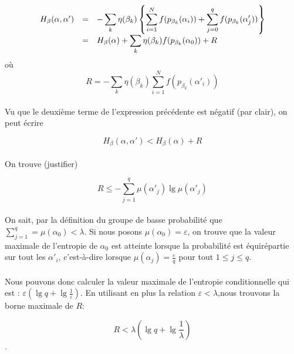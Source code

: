 	\paragraph{}
	\[
		\begin{array}{r c >{\displaystyle}l}
			H_\beta(\alpha,\alpha') &=& 
				- \sum_k\eta(\beta_k)\left\{
					\sum_{i=1}^Nf(p_{\beta_k}(\alpha_i))+
					\sum_{j=0}^qf(p_{\beta_k}(\alpha'_j))
				\right\}\\
			&=& H_\beta(\alpha) + 
				\sum_k\eta(\beta_k)f(p_{\beta_k}(\alpha_0))+R
		\end{array}
	\]
	où
	\[R=- \sum_k\eta(\beta_k)\sum_{i=1}^Nf(p_{\beta_k}(\alpha'_i))\]
	
	\paragraph{}
	Vu que le deuxième terme de l'expression précédente est négatif 
	(par clair), on peut écrire
	
	\[H_\beta(\alpha,\alpha') < H_\beta(\alpha) + R\]
	
	\paragraph{}
	On trouve (justifier)
	
	\[R \le -\sum_{j=1}^q\mu(\alpha'_j)\lg\mu(\alpha'_j)\]
	
	\paragraph{}
	On sait, par la définition du groupe de basse probabilité que 
	$\sum_{j=1}^q =\mu(\alpha_0) < \lambda$. Si nous posons 
	$\mu(\alpha_0)=\varepsilon$, on trouve que la valeur maximale 
	de l'entropie de $\alpha_0$ est atteinte lorsque la probabilité 
	est équirépartie sur tout les $\alpha'_i$, c'est-à-dire lorsque
	 $\mu(\alpha_j)=\frac{\varepsilon}{q}$ pour tout $1\le j\le q$.
	
	\paragraph{}
	Nous pouvons donc calculer la valeur maximale de l'entropie conditionnelle
	qui est : $\varepsilon \left(\lg q+\lg\frac{1}{\varepsilon}\right)$.
	En utilisant en plus la relation $\varepsilon < \lambda$,nous trouvons la
	 borne maximale de $R$:
	
	\[R<\lambda\left(\lg q+\lg\frac{1}{\lambda}\right)\].
	
